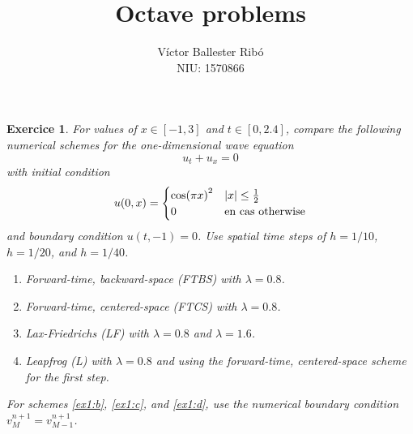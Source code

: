 \documentclass[10pt,a4paper]{article}
\title{\bfseries\Large Octave problems}
\author{Víctor Ballester Ribó\\NIU: 1570866}
\date{\parbox{\linewidth}{\centering
  Integració numèrica d'equacions en derivades parcials\endgraf
  Grau en Matemàtiques\endgraf
  Universitat Autònoma de Barcelona\endgraf
  Febrer de 2023}}
\newtheorem{exercici}{Exercice}
\theoremstyle{definition}
\theoremstyle{remark}
\begin{document}
\maketitle
\setcounter{exercici}{2}
\begin{exercici}
  For values of $x\in[-1,3]$ and $t\in [0,2.4]$, compare the following numerical schemes for the one-dimensional wave equation
  $$
    u_t+u_x=0
  $$
  with initial condition
  $$
    u(0,x)=\begin{cases}
      {\cos(\pi x)}^2 & \abs{x}\leq \frac{1}{2} \\
      0               & \text{en cas otherwise}
    \end{cases}
  $$
  and boundary condition $u(t,-1)=0$. Use spatial time steps of $h=1/10$, $h=1/20$, and $h=1/40$.
  \begin{enumerate}
    \item Forward-time, backward-space (FTBS) with $\lambda =0.8$.
          \item\label{ex1:b} Forward-time, centered-space (FTCS) with $\lambda =0.8$.
          \item\label{ex1:c} Lax-Friedrichs (LF) with $\lambda =0.8$ and $\lambda =1.6$.
          \item\label{ex1:d} Leapfrog (L) with $\lambda =0.8$ and using the forward-time, centered-space scheme for the first step.
  \end{enumerate}
  For schemes \ref{ex1:b}, \ref{ex1:c}, and \ref{ex1:d}, use the numerical boundary condition $v_M^{n+1}=v_{M-1}^{n+1}$.
\end{exercici}
\end{document}
